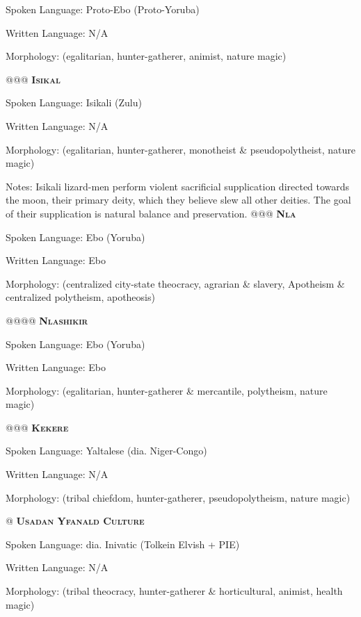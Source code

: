 \documentclass[12pt]{article}
\begin{document}
\begin{easylist}
	\normalfont Spoken Language: Proto-Ebo (Proto-Yoruba)
	
	Written Language: N/A
	
	Morphology: (egalitarian, hunter-gatherer, animist, nature magic)
	
	@@@ \textsc{\textbf{Isikal}}
	
	\normalfont Spoken Language: Isikali (Zulu)
	
	Written Language: N/A
	
	Morphology: (egalitarian, hunter-gatherer, monotheist \& pseudopolytheist, nature magic)
	
	{\footnotesize Notes: Isikali lizard-men perform violent sacrificial supplication directed towards the moon, their primary deity, which they believe slew all other deities. The goal of their supplication is natural balance and preservation.}
	@@@ \textsc{\textbf{Nla}}
	
	\normalfont Spoken Language: Ebo (Yoruba)
	
	Written Language: Ebo
	
	Morphology: (centralized city-state theocracy, agrarian \& slavery, Apotheism \& centralized polytheism, apotheosis)
	
	@@@@ \textsc{\textbf{Nlashikir}}
	
	\normalfont Spoken Language: Ebo (Yoruba)
	
	Written Language: Ebo
	
	Morphology: (egalitarian, hunter-gatherer \& mercantile, polytheism, nature magic)
	
	@@@ \textsc{\textbf{Kekere}}
	
	\normalfont Spoken Language: Yaltalese (dia. Niger-Congo)
	
	Written Language: N/A
	
	Morphology: (tribal chiefdom, hunter-gatherer, pseudopolytheism, nature magic)
	
	@ \textsc{\textbf{Usadan Yfanald Culture}}
	
	\normalfont Spoken Language: dia. Inivatic (Tolkein Elvish + PIE)
	
	Written Language: N/A
	
	Morphology: (tribal theocracy, hunter-gatherer \& horticultural, animist, health magic)
	

\end{easylist}
\end{document}
